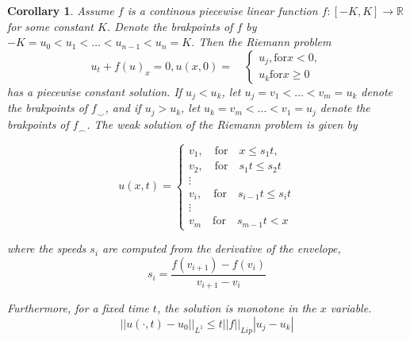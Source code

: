 \documentclass{article}
\newtheorem{corollary}{Corollary}[theorem]
\numberwithin{equation}{section}
\begin{document}
\begin{corollary}
Assume $f$ is a continous piecewise linear function $f: [-K, K] \rightarrow \mathbb{R}$ for some constant $K$. Denote the brakpoints of $f$ by $-K = u_0 < u_1 < \dots < u_{n-1} < u_n = K$. Then the Riemann problem 
\begin{equation}
    u_t + f(u)_x = 0, u(x, 0) = \quad \begin{cases} u_j, \text{for} x < 0, \\ u_k \text{for} x \geq 0 \end{cases}
\end{equation}
has a piecewise constant solution. 
If $u_j < u_k$, let $u_j = v_1 < \dots <v_m = u_k$ denote the brakpoints of $f_\smile$, and if $u_j > u_k$, let $u_k = v_m < \dots <v_1 = u_j$ denote the brakpoints of $f_\frown$. The weak solution of the Riemann problem is given by 

\begin{equation}
    u(x,t ) = \begin{cases}
    v_1, \quad \text{for} \quad x \leq s_1t, \\
    v_2, \quad \text{for} \quad s_1t \leq s_2 t\\
    \vdots \\
    v_i, \quad \text{for} \quad s_{i-1}t \leq s_i t\\
    \vdots \\
    v_m \quad \text{for} \quad s_{m-1}t < x
    \end{cases}
\end{equation}

where the speeds $s_i$ are computed from the derivative of the envelope, 
\begin{equation*}
    s_i = \frac{f(v_{i+1}) - f(v_i) } {v_{i+1} - v_i }
\end{equation*}

Furthermore, for a fixed time $t$, the solution is monotone in the $x$ variable. 
\begin{equation*}
    || u(\cdot, t) - u_0 ||_{L^1} \leq t||f||_{Lip} |u_j - u_k|
\end{equation*}
\end{corollary}
\end{document}
